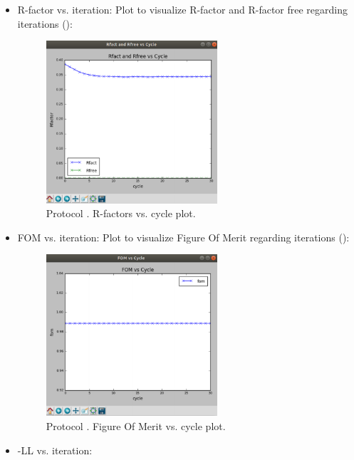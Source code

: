 \begin{itemize}
\begin{itemize}
     \item R-factor vs. iteration:
     Plot to visualize R-factor and R-factor free regarding iterations ():
        \begin{figure}[H]
         \centering 
         \captionsetup{width=.7\linewidth} 
         \includegraphics[width=0.60\textwidth]{Images_appendix/Fig133.pdf}
         \caption{Protocol . R-factors vs. cycle plot.}
         \label{fig:app_protocol_refmac_8}
        \end{figure}
     \item FOM vs. iteration:
     Plot to visualize Figure Of Merit regarding iterations ():
        \begin{figure}[H]
         \centering 
         \captionsetup{width=.7\linewidth} 
         \includegraphics[width=0.60\textwidth]{Images_appendix/Fig134.pdf}
         \caption{Protocol . Figure Of Merit vs. cycle plot.}
         \label{fig:app_protocol_refmac_9}
        \end{figure}
     \item -LL vs. iteration:

\end{itemize}
\end{itemize}
